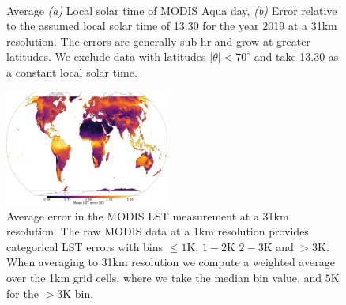 \documentclass[hess, manuscript]{copernicus}
\begin{document}
\begin{figure}
	 \\
	\caption{Average \textit{(a)} Local solar time of MODIS Aqua day, \textit{(b)} Error relative to the assumed local solar time of 13.30 for the year 2019 at a 31km resolution. The errors are generally sub-hr and grow at greater latitudes. We exclude data with latitudes $|\theta| < 70^{\circ}$ and take 13.30 as a constant local solar time.} 
	\label{fig:MODIS_time}
\end{figure}

\begin{figure}
	\includegraphics[width=0.48\textwidth]{MODIS_obs_error}
	\caption{Average error in the MODIS LST measurement at a 31km resolution. The raw MODIS data at a 1km resolution provides categorical LST errors with bins $\leq 1$K, $1 - 2$K $2-3$K and $>3$K. When averaging to 31km resolution we compute a weighted average over the 1km grid cells, where we take the median bin value, and $5$K for the $>3$K bin.} 
	\label{fig:MODIS_obs_error}
\end{figure}
\end{document}
